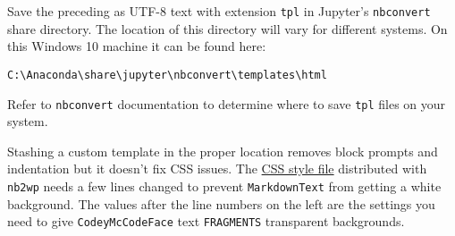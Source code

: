 \begin{Shaded}
\end{Shaded}

Save the preceding as UTF-8 text with extension \texttt{tpl} in
Jupyter's \texttt{nbconvert} share directory. The location of this
directory will vary for different systems. On this Windows 10 machine it
can be found here:

\begin{verbatim}
C:\Anaconda\share\jupyter\nbconvert\templates\html
\end{verbatim}

Refer to \texttt{nbconvert} documentation to determine where to save
\texttt{tpl} files on your system.

Stashing a custom template in the proper location removes block prompts
and indentation but it doesn't fix CSS issues. The
\href{https://github.com/bennylp/nb2wp/blob/master/style.css}{CSS style
file} distributed with \texttt{nb2wp} needs a few lines changed to
prevent \texttt{MarkdownText} from getting a white background. The
values after the line numbers on the left are the settings you need to
give \texttt{CodeyMcCodeFace} text \texttt{FRAGMENTS} transparent
backgrounds.

